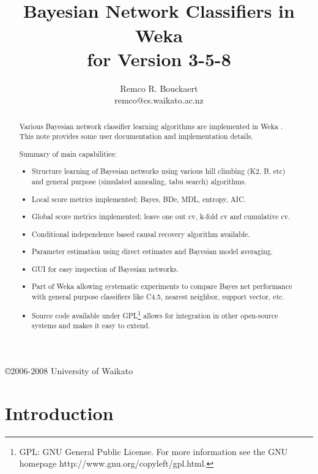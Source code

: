 \documentclass[a4paper]{article}
\title{\epsfig{file=images/coat_of_arms.eps,width=10cm}\vspace{3cm}\\Bayesian Network Classifiers in Weka\\for Version 3-5-8}
\author{Remco R. Bouckaert\\remco@cs.waikato.ac.nz}
\begin{document}
\begin{titlepage}

\maketitle
\thispagestyle{empty}

\center
\vspace{8cm}

\copyright 2006-2008 University of Waikato

\end{titlepage}

\begin{abstract}
Various Bayesian network classifier learning algorithms are implemented in Weka \cite{weka}.
This note provides some user documentation and implementation details.

Summary of main capabilities:
\begin{itemize}
  \item Structure learning of Bayesian networks using various hill climbing (K2, B, etc) and
general purpose (simulated annealing, tabu search) algorithms.
  \item Local score metrics implemented; Bayes, BDe, MDL, entropy, AIC.
  \item Global score metrics implemented; leave one out cv, k-fold cv and cumulative cv.
  \item Conditional independence based causal recovery algorithm available.
  \item Parameter estimation using direct estimates and Bayesian model averaging.
  \item GUI for easy inspection of Bayesian networks.
  \item Part of Weka allowing systematic experiments to compare Bayes net performance with general 
purpose classifiers like C4.5, nearest neighbor, support vector, etc.
  \item Source code available under GPL\footnote{GPL: GNU General Public License. For more information see the GNU homepage http://www.gnu.org/copyleft/gpl.html.} allows for integration in other open-source systems and makes it easy to extend.
\end{itemize}
\end{abstract}
\newpage

\tableofcontents
\newpage

\section{Introduction}
\end{document}
